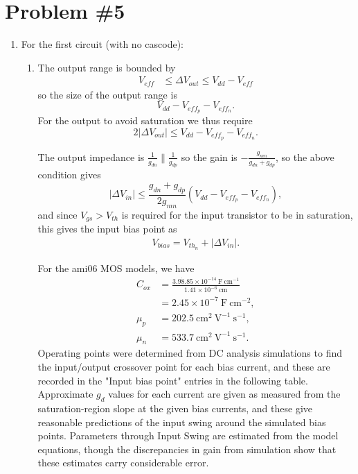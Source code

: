 \documentclass{article}
\begin{document}
\section*{Problem \#5}
\begin{enumerate}
  \item{
    For the first circuit (with no cascode):
    \begin{enumerate}
      \item{
        The output range is bounded by
        \begin{align*}
        V_{eff} &\leq \Delta V_{out} 
                \leq V_{dd} - V_{eff} 
        \end{align*}
        so the size of the output range is
        $$
        V_{dd} - V_{eff_{p}} - V_{eff_{n}}.
        $$
        For the output to avoid saturation we thus require
        $$
        2|\Delta V_{out}| \leq 
        V_{dd} - V_{eff_p} - V_{eff_n}.
        $$

        The output impedance is $\frac{1}{g_{dn}} \| \frac{1}{g_{dp}}$ so the gain is 
        $-\frac{g_{mn}}{g_{dn} + g_{dp}}$, so the above condition gives
        $$
        |\Delta V_{in}| \leq \frac{g_{dn} + g_{dp}}{2g_{mn}} (
        V_{dd} - V_{eff_p} - V_{eff_n}),
        $$
        and since $V_{gs} > V_{th}$ is required for the input transistor
        to be in saturation, this gives the input bias point as
        \begin{align*}
        V_{bias} = V_{th_{n}} + |\Delta V_{in}|.
        \end{align*}

        For the ami06 MOS models, we have 
        \begin{align*}
        C_{ox} &= \frac{3.9 \dot 8.85 \times 10^{-14} ~\mathrm{F}~\mathrm{cm}^{-1}}
                      {1.41 \times 10^{-6} ~\mathrm{cm}} \\
               &= 2.45 \times 10^{-7} ~\mathrm{F}~\mathrm{cm}^{-2}, \\
        \mu_p  &= 202.5 ~\mathrm{cm}^2~\mathrm{V}^{-1}~\mathrm{s}^{-1}, \\
        \mu_n  &= 533.7 ~\mathrm{cm}^2~\mathrm{V}^{-1}~\mathrm{s}^{-1}.
        \end{align*}
        Operating points were determined from DC analysis simulations to find the
        input/output crossover point for each bias current, and these are recorded 
        in the "Input bias point" entries in the following table.
        Approximate $g_{d}$ values for each current are given as measured 
        from the saturation-region slope at the given bias currents, and these give
        reasonable predictions of the input swing around the simulated bias points.
        Parameters through Input Swing are estimated from the model equations, 
        though the discrepancies in gain from simulation show that these estimates
        carry considerable error.

}
\end{enumerate}}
\end{enumerate}
\end{document}
